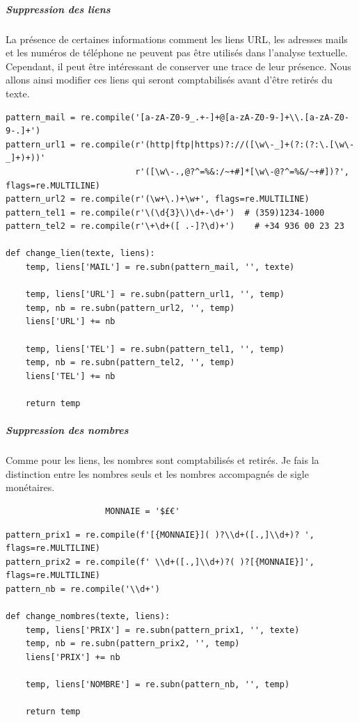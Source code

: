 			\subparagraph{Suppression des liens}
				La présence de certaines informations comment les liens URL, les adresses mails et les numéros de téléphone ne peuvent pas être utilisés dans l'analyse textuelle.
                Cependant, il peut être intéressant de conserver une trace de leur présence.
                Nous allons ainsi modifier ces liens qui seront comptabilisés avant d'être retirés du texte.

				\begin{lstlisting}[title=Nettoyage des liens,label={lst:clear_liens}]
pattern_mail = re.compile('[a-zA-Z0-9_.+-]+@[a-zA-Z0-9-]+\\.[a-zA-Z0-9-.]+')
pattern_url1 = re.compile(r'(http|ftp|https)?://([\w\-_]+(?:(?:\.[\w\-_]+)+))'
                          r'([\w\-.,@?^=%&:/~+#]*[\w\-@?^=%&/~+#])?', flags=re.MULTILINE)
pattern_url2 = re.compile(r'(\w+\.)+\w+', flags=re.MULTILINE)
pattern_tel1 = re.compile(r'\(\d{3}\)\d+-\d+')  # (359)1234-1000
pattern_tel2 = re.compile(r'\+\d+([ .-]?\d)+')    # +34 936 00 23 23

def change_lien(texte, liens):
    temp, liens['MAIL'] = re.subn(pattern_mail, '', texte)

    temp, liens['URL'] = re.subn(pattern_url1, '', temp)
    temp, nb = re.subn(pattern_url2, '', temp)
    liens['URL'] += nb

    temp, liens['TEL'] = re.subn(pattern_tel1, '', temp)
    temp, nb = re.subn(pattern_tel2, '', temp)
    liens['TEL'] += nb

    return temp
                \end{lstlisting}

			\subparagraph{Suppression des nombres}
				Comme pour les liens, les nombres sont comptabilisés et retirés.
                Je fais la distinction entre les nombres seuls et les nombres accompagnés de sigle monétaires.
                \begin{verbatim}
                    MONNAIE = '$£€'
                \end{verbatim}
				\begin{lstlisting}[title=Nettoyage des nombres,label={lst:clear_nombre}]
pattern_prix1 = re.compile(f'[{MONNAIE}]( )?\\d+([.,]\\d+)? ', flags=re.MULTILINE)
pattern_prix2 = re.compile(f' \\d+([.,]\\d+)?( )?[{MONNAIE}]', flags=re.MULTILINE)
pattern_nb = re.compile('\\d+')

def change_nombres(texte, liens):
    temp, liens['PRIX'] = re.subn(pattern_prix1, '', texte)
    temp, nb = re.subn(pattern_prix2, '', temp)
    liens['PRIX'] += nb

    temp, liens['NOMBRE'] = re.subn(pattern_nb, '', temp)

    return temp
                \end{lstlisting}

